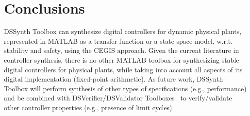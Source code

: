 \documentclass[10pt,conference]{IEEEtran}
\newcommand\tool{{DSSynth Toolbox}\xspace}
\begin{document}
\section{Conclusions}

\tool can synthesize digital controllers for dynamic physical plants, 
represented in MATLAB as a transfer function or a state-space model,  
w.r.t. stability and safety, using the CEGIS approach. 
%
Given the current literature in controller synthesis, there is no other MATLAB toolbox 
for synthesizing stable digital controllers for physical plants, while taking into account all aspects of its digital implementation (fixed-point arithmetic). 
%
As future work, \tool will perform synthesis of other types of specifications (e.g., performance) 
and be combined with DSVerifier/DSValidator Toolboxes~\cite{issta2017,dsvalidator} to verify/validate 
other controller properties (e.g., presence of limit cycles). 


 
\end{document}
